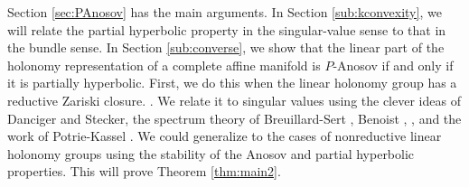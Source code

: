Section \ref{sec:PAnosov} has the main arguments. 
In Section \ref{sub:kconvexity}, we will relate the partial hyperbolic property in the singular-value sense to that in the bundle sense. 
In Section \ref{sub:converse}, we show that the linear part of 
the holonomy representation of a complete affine manifold 
is $P$-Anosov if and only if it is partially hyperbolic. 
First, we do this when the linear holonomy group
has a reductive Zariski closure. 
. We relate it
to singular values using the clever ideas of Danciger and Stecker,
the spectrum theory of Breuillard-Sert \cite{BS2021}, Benoist \cite{Benoist97}, \cite{Benoist98}, and the work of Potrie-Kassel \cite{KP22}.
We could generalize to the cases of nonreductive linear holonomy groups using 
the stability of the Anosov and partial hyperbolic properties. 
This will prove Theorem  \ref{thm:main2}. %



